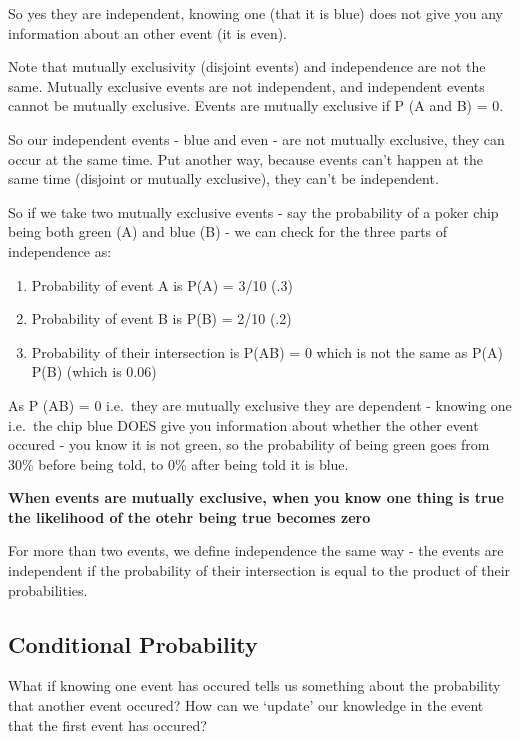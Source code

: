 \documentclass[]{book}
\theoremstyle{definition}
\theoremstyle{definition}
\theoremstyle{definition}
\theoremstyle{remark}
\begin{document}
So yes they are independent, knowing one (that it is blue) does not give
you any information about an other event (it is even).

Note that mutually exclusivity (disjoint events) and independence are
not the same. Mutually exclusive events are not independent, and
independent events cannot be mutually exclusive. Events are mutually
exclusive if P (A and B) = 0.

So our independent events - blue and even - are not mutually exclusive,
they can occur at the same time. Put another way, because events can't
happen at the same time (disjoint or mutually exclusive), they can't be
independent.

So if we take two mutually exclusive events - say the probability of a
poker chip being both green (A) and blue (B) - we can check for the
three parts of independence as:

\begin{enumerate}
\def\labelenumi{\arabic{enumi}.}
\item
  Probability of event A is P(A) = 3/10 (.3)
\item
  Probability of event B is P(B) = 2/10 (.2)
\item
  Probability of their intersection is P(AB) = 0 which is not the same
  as P(A) P(B) (which is 0.06)
\end{enumerate}

As P (AB) = 0 i.e.~they are mutually exclusive they are dependent -
knowing one i.e.~the chip blue DOES give you information about whether
the other event occured - you know it is not green, so the probability
of being green goes from 30\% before being told, to 0\% after being told
it is blue.

\textbf{When events are mutually exclusive, when you know one thing is
true the likelihood of the otehr being true becomes zero}

For more than two events, we define independence the same way - the
events are independent if the probability of their intersection is equal
to the product of their probabilities.

\subsection{Conditional Probability}\label{conditional-probability}

What if knowing one event has occured tells us something about the
probability that another event occured? How can we `update' our
knowledge in the event that the first event has occured?
\end{document}
